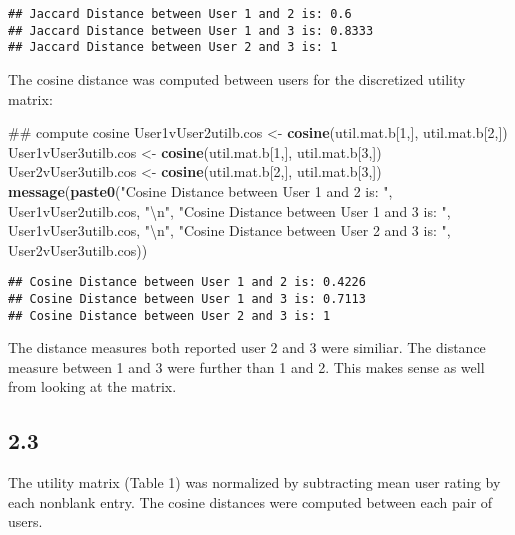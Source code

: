 \documentclass[]{article}
\newenvironment{Shaded}{\begin{snugshade}}{\end{snugshade}}
\newcommand{\KeywordTok}[1]{\textcolor[rgb]{0.13,0.29,0.53}{\textbf{{#1}}}}
\newcommand{\DecValTok}[1]{\textcolor[rgb]{0.00,0.00,0.81}{{#1}}}
\newcommand{\CharTok}[1]{\textcolor[rgb]{0.31,0.60,0.02}{{#1}}}
\newcommand{\StringTok}[1]{\textcolor[rgb]{0.31,0.60,0.02}{{#1}}}
\newcommand{\NormalTok}[1]{{#1}}
\begin{document}
\begin{verbatim}
## Jaccard Distance between User 1 and 2 is: 0.6
## Jaccard Distance between User 1 and 3 is: 0.8333
## Jaccard Distance between User 2 and 3 is: 1
\end{verbatim}

The cosine distance was computed between users for the discretized
utility matrix:

\begin{Shaded}
\begin{Highlighting}[]
\NormalTok{## compute cosine}
\NormalTok{User1vUser2utilb.cos <-}\StringTok{ }\KeywordTok{cosine}\NormalTok{(util.mat.b[}\DecValTok{1}\NormalTok{,], util.mat.b[}\DecValTok{2}\NormalTok{,])}
\NormalTok{User1vUser3utilb.cos <-}\StringTok{ }\KeywordTok{cosine}\NormalTok{(util.mat.b[}\DecValTok{1}\NormalTok{,], util.mat.b[}\DecValTok{3}\NormalTok{,])}
\NormalTok{User2vUser3utilb.cos <-}\StringTok{ }\KeywordTok{cosine}\NormalTok{(util.mat.b[}\DecValTok{2}\NormalTok{,], util.mat.b[}\DecValTok{3}\NormalTok{,])}
\KeywordTok{message}\NormalTok{(}\KeywordTok{paste0}\NormalTok{(}\StringTok{"Cosine Distance between User 1 and 2 is: "}\NormalTok{, User1vUser2utilb.cos, }\StringTok{"}\CharTok{\textbackslash{}n}\StringTok{"}\NormalTok{,}
               \StringTok{"Cosine Distance between User 1 and 3 is: "}\NormalTok{, User1vUser3utilb.cos, }\StringTok{"}\CharTok{\textbackslash{}n}\StringTok{"}\NormalTok{,}
               \StringTok{"Cosine Distance between User 2 and 3 is: "}\NormalTok{, User2vUser3utilb.cos))}
\end{Highlighting}
\end{Shaded}

\begin{verbatim}
## Cosine Distance between User 1 and 2 is: 0.4226
## Cosine Distance between User 1 and 3 is: 0.7113
## Cosine Distance between User 2 and 3 is: 1
\end{verbatim}

The distance measures both reported user 2 and 3 were similiar. The
distance measure between 1 and 3 were further than 1 and 2. This makes
sense as well from looking at the matrix.

\subsection{2.3}\label{section-2}

The utility matrix (Table 1) was normalized by subtracting mean user
rating by each nonblank entry. The cosine distances were computed
between each pair of users.
\end{document}
